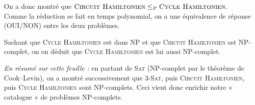 \begin{exercice}[Le problème \textsc{Cycle Hamiltonien}\footnote{\textit{Source :} \url{https://www.youtube.com/watch?v=kl2k_wgYYic}.}]
  On a donc montré que $\textsc{Circuit Hamiltonien} \le_P \textsc{Cycle Hamiltonien}$.
  Comme la réduction se fait en temps polynomial, on a une équivalence de réponse (\textsc{OUI}/\textsc{NON}) entre les deux problèmes.

  Sachant que \textsc{Cycle Hamiltonien} est dans NP et que \textsc{Circuit Hamiltonien} est NP-complet,  
  on en déduit que \textsc{Cycle Hamiltonien} est lui aussi NP-complet.

  \textit{En résumé sur cette feuille :}  
  en partant de \textsc{Sat} (NP-complet par le théorème de Cook–Levin),  
  on a montré successivement que \textsc{3-Sat}, puis \textsc{Circuit Hamiltonien}, puis \textsc{Cycle Hamiltonien}  
  sont NP-complets.  
  Ceci vient donc enrichir notre « catalogue » de problèmes NP-complets.

\end{exercice}

\endgroup
\endinput
